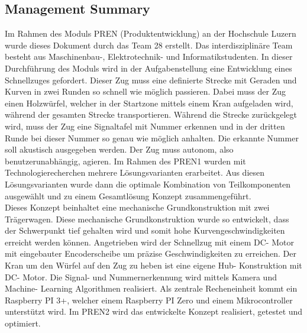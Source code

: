 \documentclass[../../main.tex]{subfiles}
\begin{document}
\subsection{Management Summary}
Im Rahmen des Moduls PREN (Produktentwicklung) an der Hochschule Luzern wurde dieses Dokument durch das Team 28
erstellt. Das interdisziplinäre Team besteht aus Maschinenbau-, Elektrotechnik- und Informatikstudenten. In dieser
Durchführung des Moduls wird in der Aufgabenstellung eine Entwicklung eines Schnellzuges gefordert. Dieser Zug muss eine
definierte Strecke mit Geraden und Kurven in zwei Runden so schnell wie möglich passieren. Dabei muss der Zug einen
Holzwürfel, welcher in der Startzone mittels einem Kran aufgeladen wird, während der gesamten Strecke transportieren.
Während die Strecke zurückgelegt wird, muss der Zug eine Signaltafel mit Nummer erkennen und in der dritten Runde bei
dieser Nummer so genau wie möglich anhalten. Die erkannte Nummer soll akustisch ausgegeben werden. Der Zug muss
autonom, also benutzerunabhängig, agieren. Im Rahmen des PREN1 wurden mit Technologierecherchen mehrere Lösungsvarianten
erarbeitet. Aus diesen Lösungsvarianten wurde dann die optimale Kombination von Teilkomponenten ausgewählt und zu einem
Gesamtlösung Konzept zusammengeführt.\\
Dieses Konzept beinhaltet eine mechanische Grundkonstruktion mit zwei Trägerwagen. Diese mechanische Grundkonstruktion wurde so entwickelt, dass der Schwerpunkt tief gehalten wird und somit hohe Kurvengeschwindigkeiten erreicht werden können. Angetrieben wird der Schnellzug mit einem DC- Motor mit eingebauter Encoderscheibe um präzise Geschwindigkeiten zu erreichen. Der Kran um den Würfel auf den Zug zu heben ist eine eigene Hub- Konstruktion mit DC- Motor. Die Signal- und Nummernerkennung wird mittels Kamera und Machine- Learning Algorithmen realisiert. Als zentrale Recheneinheit kommt ein Raspberry PI 3+, welcher einem Raspberry PI Zero und einem Mikrocontroller unterstützt wird. Im PREN2 wird das entwickelte Konzept realisiert, getestet und optimiert.
\pagebreak
\end{document}
